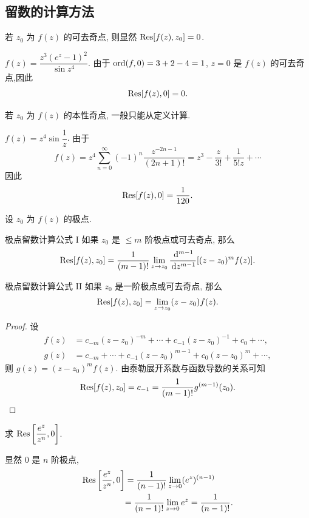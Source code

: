 \subsection{留数的计算方法}

若 $z_0$ 为 $f(z)$ 的可去奇点, 则显然 ${\mathrm{Res}}[f(z),z_0]=0$.

\begin{example}
		$f(z)=\dfrac{z^3(e^z-1)^2}{\sin z^4}$.
	{由于 ${\mathrm{ord}}(f,0)=3+2-4=1$, $z=0$ 是 $f(z)$ 的可去奇点,因此 \[{\mathrm{Res}}[f(z),0]=0.\]
	}
\end{example}

若 $z_0$ 为 $f(z)$ 的本性奇点, 一般只能从定义计算.

\begin{example}
	$f(z)=z^4\sin\dfrac1z$.
{%
	由于
	\[f(z)=z^4\sum_{n=0}^\infty(-1)^n\frac{z^{-2n-1}}{(2n+1)!}
	=z^3-\frac z{3!}+\frac1{5!z}+\cdots\]
}
{%
	因此 \[{\mathrm{Res}}[f(z),0]=\frac1{120}.\]
}
\end{example}

设 $z_0$ 为 $f(z)$ 的极点.

\begin{theorem}{极点留数计算公式 I}
	如果 $z_0$ 是 $\le m$ 阶极点或可去奇点, 那么
	\[{\mathrm{Res}}[f(z),z_0]=\frac1{(m-1)!}\lim_{z\to z_0}\frac{\,\mathrm{d}^{m-1}}{\,\mathrm{d} z^{m-1}}[(z-z_0)^mf(z)].\]
\end{theorem}

\begin{theorem}{极点留数计算公式 II}
	如果 $z_0$ 是一阶极点或可去奇点, 那么
	\[{\mathrm{Res}}[f(z),z_0]=\lim\limits_{z\to z_0}(z-z_0)f(z).\]
\end{theorem}

\begin{proof}
	设
	\begin{align*}
		f(z)&=c_{-m}(z-z_0)^{-m}+\cdots+c_{-1}(z-z_0)^{-1}+c_0+\cdots,\\
		g(z)&=c_{-m}+\cdots+c_{-1}(z-z_0)^{m-1}+c_0(z-z_0)^m+\cdots,
	\end{align*}
{%
	则 $g(z)=(z-z_0)^mf(z)$.
}%
{%
	由泰勒展开系数与函数导数的关系可知
	\[{\mathrm{Res}}[f(z),z_0]=c_{-1}=\dfrac1{(m-1)!}g^{(m-1)}(z_0).\qedhere\]
}
\end{proof}

\begin{example}
	求 ${\mathrm{Res}}\left[\dfrac{e^z}{z^n},0\right]$.
\end{example}

\begin{solution}
		显然 $0$ 是 $n$ 阶极点,
	{\begin{align*}
			{\mathrm{Res}}\left[\frac{e^z}{z^n},0\right]&=\frac1{(n-1)!}\lim_{z\to0}(e^z)^{(n-1)}\\
			&{=\frac1{(n-1)!}\lim_{z\to0}e^z=\frac1{(n-1)!}.}
		\end{align*}
	}
\end{solution}

